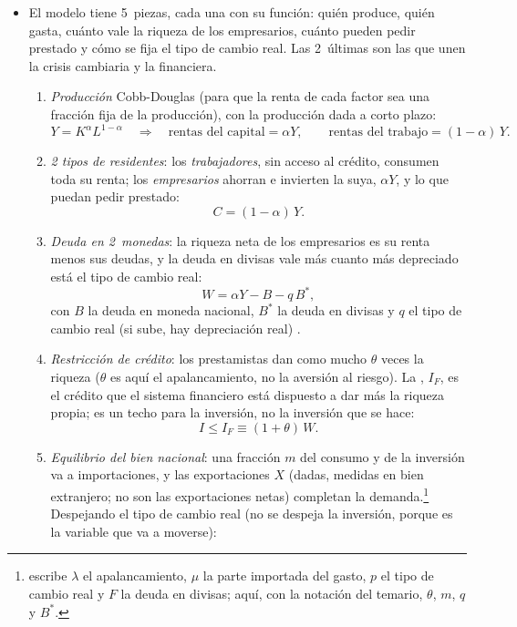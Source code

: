 \documentclass[11pt]{article}
\begin{document}
\begin{itemize}
\item El modelo tiene 5~piezas, cada una con su función: quién produce, quién gasta, cuánto vale la riqueza de los empresarios, cuánto pueden pedir prestado y cómo se fija el tipo de cambio real. Las 2~últimas son las que unen la crisis cambiaria y la financiera.
  \begin{enumerate}
  \item \emph{Producción} Cobb-Douglas (para que la renta de cada factor sea una fracción fija de la producción), con la producción dada a corto plazo:
    \begin{equation}\label{eq:krugman-produccion}
    Y=K^{\alpha}L^{1-\alpha}\quad\Longrightarrow\quad \text{rentas del capital}=\alpha Y,\qquad \text{rentas del trabajo}=(1-\alpha)\,Y .
    \end{equation}
  \item \emph{2 tipos de residentes}: los \emph{trabajadores}, sin acceso al crédito, consumen toda su renta; los \emph{empresarios} ahorran e invierten la suya, $\alpha Y$, y lo que puedan pedir prestado:
    \begin{equation}\label{eq:krugman-consumo}
    C=(1-\alpha)\,Y .
    \end{equation}
  \item \emph{Deuda en 2~monedas}: la riqueza neta de los empresarios es su renta menos sus deudas, y la deuda en divisas vale más cuanto más depreciado está el tipo de cambio real:
    \begin{equation}\label{eq:krugman-riqueza}
    W=\alpha Y-B-q\,B^{*},
    \end{equation}
    con $B$ la deuda en moneda nacional, $B^{*}$ la deuda en divisas y $q$ el tipo de cambio real (si sube, hay depreciación real) .
  \item \emph{Restricción de crédito}: los prestamistas dan como mucho $\theta$ veces la riqueza ($\theta$ es aquí el apalancamiento, no la aversión al riesgo). La , $I_F$, es el crédito que el sistema financiero está dispuesto a dar más la riqueza propia; es un techo para la inversión, no la inversión que se hace:
    \begin{equation}\label{eq:krugman-credito}
    I\le I_F\equiv(1+\theta)\,W .
    \end{equation}
  \item \emph{Equilibrio del bien nacional}: una fracción $m$ del consumo y de la inversión va a importaciones, y las exportaciones $X$ (dadas, medidas en bien extranjero; no son las exportaciones netas) completan la demanda.\footnote{ escribe $\lambda$ el apalancamiento, $\mu$ la parte importada del gasto, $p$ el tipo de cambio real y $F$ la deuda en divisas; aquí, con la notación del temario, $\theta$, $m$, $q$ y $B^{*}$.} Despejando el tipo de cambio real (no se despeja la inversión, porque es la variable que va a moverse):

\end{enumerate}
\end{itemize}
\end{document}
